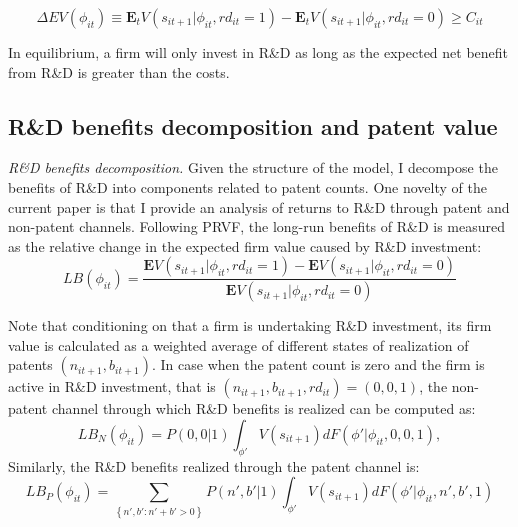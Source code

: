 \documentclass[English]{article}
\begin{document}
\begin{equation}
    \Delta EV(\phi_{it}) \equiv \mathbf{E}_t V(s_{it+1}|\phi_{it}, rd_{it}=1)-\mathbf{E}_t V(s_{it+1}|\phi_{it},rd_{it}=0)\geq C_{it}
\end{equation}

In equilibrium, a firm will only invest in R\&D as long as the expected net benefit from R\&D is greater than the costs.

\subsection{R\&D benefits decomposition and patent value}
\textit{R\&D benefits decomposition.} Given the structure of the model, I decompose the benefits of R\&D into components related to patent counts. One novelty of the current paper is that I provide an analysis of returns to R\&D through patent and non-patent channels. Following PRVF, the long-run benefits of R\&D is measured as the relative change in the expected firm value caused by R\&D investment:
\begin{equation}
    LB(\phi_{it}) = \frac{\mathbf{E}V(s_{it+1}|\phi_{it}, rd_{it}=1)-\mathbf{E}V(s_{it+1}|\phi_{it}, rd_{it}=0)}{\mathbf{E}V(s_{it+1}|\phi_{it}, rd_{it}=0)}
\end{equation}

Note that conditioning on that a firm is undertaking R\&D investment, its firm value is calculated as a weighted average of different states of realization of patents $(n_{it+1}, b_{it+1})$. In case when the patent count is zero and the firm is active in R\&D investment, that is $(n_{it+1}, b_{it+1}, rd_{it})=(0, 0, 1)$, the non-patent channel through which R\&D benefits is realized can be computed as:
\begin{equation} \label{LB_N}
    LB_N(\phi_{it}) = P(0,0|1)\int_{\phi'}V(s_{it+1})dF(\phi'|\phi_{it}, 0, 0, 1),
\end{equation}
Similarly, the R\&D benefits realized through the patent channel is:
\begin{equation} \label{LB_P}
    LB_P(\phi_{it}) = \sum_{\left\{n',b': n' + b' >0\right\}}P(n',b'|1)\int_{\phi'}V(s_{it+1})dF(\phi'|\phi_{it}, n', b', 1)
\end{equation}
\end{document}
